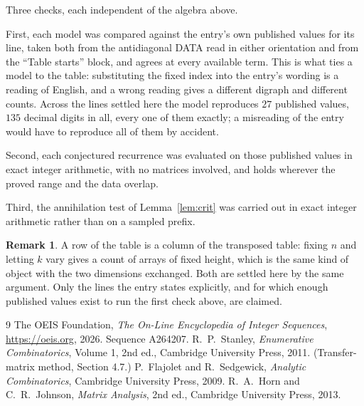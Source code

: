 \documentclass[11pt,a4paper]{article}
\theoremstyle{plain}
\theoremstyle{definition}
\newtheorem{remark}[theorem]{Remark}
\begin{document}
Three checks, each independent of the algebra above.

First, each model was compared against the entry's own published values for its line, taken
both from the antidiagonal DATA read in either orientation and from the ``Table starts''
block, and agrees at every available term. This is what ties a model to the table:
substituting the fixed index into the entry's wording is a reading of English, and a wrong
reading gives a different digraph and different counts. Across the lines settled here the
model reproduces $27$ published values, $135$ decimal digits in all, every one of
them exactly; a misreading of the entry would have to reproduce all of them by accident.

Second, each conjectured recurrence was evaluated on those published values in exact
integer arithmetic, with no matrices involved, and holds wherever the proved range and the
data overlap.

Third, the annihilation test of Lemma~\ref{lem:crit} was carried out in exact integer
arithmetic rather than on a sampled prefix.

\begin{remark}
A row of the table is a column of the transposed table: fixing $n$ and letting $k$ vary gives a
count of arrays of fixed height, which is the same kind of object with the two dimensions
exchanged. Both are settled here by the same argument. Only the lines the entry states
explicitly, and for which enough published values exist to run the first check above, are
claimed.
\end{remark}

\begin{thebibliography}{9}
 The OEIS Foundation, \emph{The On-Line Encyclopedia of Integer
Sequences}, \url{https://oeis.org}, 2026. Sequence A264207.
 R.~P.~Stanley, \emph{Enumerative Combinatorics}, Volume 1, 2nd ed.,
Cambridge University Press, 2011. (Transfer-matrix method, Section 4.7.)
 P.~Flajolet and R.~Sedgewick, \emph{Analytic Combinatorics}, Cambridge
University Press, 2009.
 R.~A.~Horn and C.~R.~Johnson, \emph{Matrix Analysis}, 2nd ed., Cambridge
University Press, 2013.
\end{thebibliography}
\end{document}

